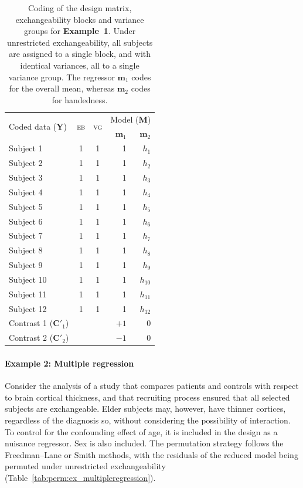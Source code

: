 \begin{table}[!t]
\caption[Coding for Example 1]{Coding of the design matrix, exchangeability blocks and variance groups for \textbf{Example~1}. Under unrestricted exchangeability, all subjects are assigned to a single block, and with identical variances, all to a single variance group. The regressor $\mathbf{m}_1$ codes for the overall mean, whereas $\mathbf{m}_2$ codes for handedness.}
\begin{center}
{\small
\begin{tabular}{@{}lccrr@{}}
\toprule
\multirow{2}{*}{\vspace*{-1.7mm}Coded data ($\mathbf{Y}$)} & \multirow{2}{*}{\vspace*{-1.7mm}\textsc{eb}} & \multirow{2}{*}{\vspace*{-1.7mm}\textsc{vg}} & \multicolumn{2}{c}{Model ($\mathbf{M}$)\hspace*{-2mm}}\\
\cmidrule(l){4-5}
& & &  $\mathbf{m}_1$ & $\mathbf{m}_2$\\
\midrule
Subject 1  & 1 & 1 & 1 & $h_{1}$\\
Subject 2  & 1 & 1 & 1 & $h_{2}$\\
Subject 3  & 1 & 1 & 1 & $h_{3}$\\
Subject 4  & 1 & 1 & 1 & $h_{4}$\\
Subject 5  & 1 & 1 & 1 & $h_{5}$\\
Subject 6  & 1 & 1 & 1 & $h_{6}$\\
Subject 7  & 1 & 1 & 1 & $h_{7}$\\
Subject 8  & 1 & 1 & 1 & $h_{8}$\\
Subject 9  & 1 & 1 & 1 & $h_{9}$\\
Subject 10 & 1 & 1 & 1 & $h_{10}$\\
Subject 11 & 1 & 1 & 1 & $h_{11}$\\
Subject 12 & 1 & 1 & 1 & $h_{12}$\\
\midrule
Contrast 1 ($\mathbf{C}'_1$) & & & $+1$ & 0\\
Contrast 2 ($\mathbf{C}'_2$) & & & $-1$ & 0\\
\bottomrule
\end{tabular}}
\end{center}
\label{tab:perm:ex_meaneffect}
\end{table}

\paragraph{Example 2: Multiple regression} Consider the analysis of a study that compares patients and controls with respect to brain cortical thickness, and that recruiting process ensured that all selected subjects are exchangeable. Elder subjects may, however, have thinner cortices, regardless of the diagnosis so, without considering the possibility of interaction. To control for the confounding effect of age, it is included in the design as a nuisance regressor. Sex is also included. The permutation strategy follows the Freedman--Lane or Smith methods, with the residuals of the reduced model being permuted under unrestricted exchangeability (Table~\ref{tab:perm:ex_multipleregression}).

